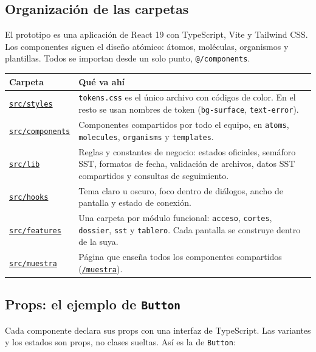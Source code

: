 \documentclass[11pt]{article}
\newcommand{\urlapp}{https://thankstochatgpt.github.io/LOARD}
\newcommand{\app}[1]{\href{\urlapp#1}{\texttt{#1}}}
\newcommand{\codigo}[1]{\href{https://github.com/ThanksToChatGPT/LOARD/tree/main/Hito\%202/Modulo-I-Prototipo/prototipo/src/#1}{\texttt{src/#1}}}
\begin{document}
\subsection*{Organización de las carpetas}

El prototipo es una aplicación de React 19 con TypeScript, Vite y Tailwind CSS. Los componentes siguen el diseño atómico: átomos, moléculas, organismos y plantillas. Todos se importan desde un solo punto, \texttt{@/components}.

\begin{center}
\begin{tabular}{|>{\raggedright\arraybackslash}m{3.6cm}|>{\raggedright\arraybackslash}m{12cm}|}
\hline
\textbf{Carpeta} & \textbf{Qué va ahí} \\ \hline
\codigo{styles} & \texttt{tokens.css} es el único archivo con códigos de color. En el resto se usan nombres de token (\texttt{bg-surface}, \texttt{text-error}). \\ \hline
\codigo{components} & Componentes compartidos por todo el equipo, en \texttt{atoms}, \texttt{molecules}, \texttt{organisms} y \texttt{templates}. \\ \hline
\codigo{lib} & Reglas y constantes de negocio: estados oficiales, semáforo SST, formatos de fecha, validación de archivos, datos SST compartidos y consultas de seguimiento. \\ \hline
\codigo{hooks} & Tema claro u oscuro, foco dentro de diálogos, ancho de pantalla y estado de conexión. \\ \hline
\codigo{features} & Una carpeta por módulo funcional: \texttt{acceso}, \texttt{cortes}, \texttt{dossier}, \texttt{sst} y \texttt{tablero}. Cada pantalla se construye dentro de la suya. \\ \hline
\codigo{muestra} & Página que enseña todos los componentes compartidos (\app{/muestra}). \\ \hline
\end{tabular}
\end{center}


\subsection*{Props: el ejemplo de \texttt{Button}}

Cada componente declara sus props con una interfaz de TypeScript. Las variantes y los estados son props, no clases sueltas. Así es la de \texttt{Button}:
\end{document}
